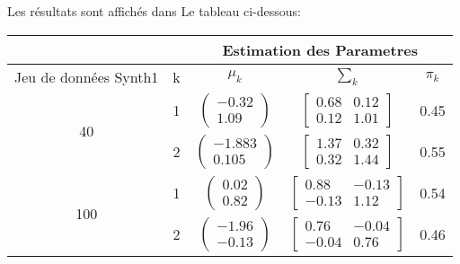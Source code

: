 \documentclass[10pt]{article}
\begin{document}
			Les résultats sont affichés dans Le tableau ci-dessous:
			\begin{center}		
			\begin{tabular}{ | c | c | c | c | c |}
				\rowcolor{lightgray}
			& &  \multicolumn{3}{c|}{Estimation des Parametres} \\
			\hline
			Jeu de données Synth1 & k & $\mu_{k}$ & $\sum_{k}$ & $\pi_{k} $\\
			\hline
			\multirow{2}{*}{40}       &   1&     $\begin{pmatrix} -0.32\\1.09 \end{pmatrix}$                 &     $\begin{bmatrix} 0.68 & 0.12 \\ 0.12 & 1.01 \end{bmatrix}$      & 	0.45				\\\cline{2-5}
			
			      									        &   2&      $\begin{pmatrix} -1.883\\0.105 \end{pmatrix}$          &         $\begin{bmatrix} 1.37 & 0.32 \\ 0.32 &1.44 \end{bmatrix}$        & 			0.55  		\\  
			      									         
			\hline
			\hline
			\multirow{2}{*}{100}      &   1&    $\begin{pmatrix} 0.02\\0.82 \end{pmatrix}$              &           $\begin{bmatrix} 0.88 & -0.13 \\ -0.13 & 1.12 \end{bmatrix}$      & 		0.54	   \\\cline{2-5}
			      											
			      											 &   2&        $\begin{pmatrix} -1.96\\-0.13 \end{pmatrix}$          &         $\begin{bmatrix} 0.76 & -0.04 \\ -0.04 & 0.76 \end{bmatrix}$               & 			0.46		\\
			      											

\end{tabular}
\end{center}
\end{document}
